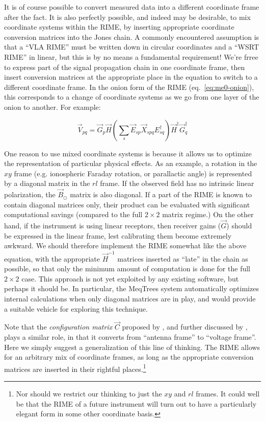 \documentclass[]{aa}
\begin{document}
It is of course possible to convert measured data into a different coordinate frame after the fact. It is also perfectly possible, and indeed may be desirable, to mix coordinate systems within the RIME, by inserting appropriate coordinate conversion matrices into the Jones chain. A commonly encountered assumption is that a ``VLA RIME'' must be written down in circular coordinates and a ``WSRT RIME'' in linear, but this is by no means a fundamental requirement! We're frree to express part of the signal propagation chain in one coordinate frame, then insert conversion matrices at the appropriate place in the equation to switch to a different coordinate frame. In the onion form of the RIME (eq.~\ref{eq:me0-onion}), this corresponds to a change of coordinate systems as we go from one layer of the onion to another. For example:

\[
\vec V_{pq} = \vec G_p \vec H \left ( \sum_{s}{\vec E_{sp} \vec X_{spq} E^\dagger_{sq}} \right ) \vec H^\dagger \vec G^\dagger_q
\] 

One reason to use mixed coordinate systems is because it allows us to optimize the representation of particular physical effects. As an example, a rotation in the $xy$ frame (e.g. ionospheric Faraday rotation, or parallactic angle) is represented by a diagonal matrix in the $rl$ frame. If the observed field has no intrinsic linear polarization, the $\vec B_\odot$ matrix is also diagonal. If a part of the RIME is known to contain diagonal matrices only, their product can be evaluated with significant computational savings (compared to the full $2\times2$ matrix regime.) On the other hand, if the instrument is using linear receptors, then receiver gains ($\vec G$) should be expressed in the linear frame, lest calibrating them become extremely awkward. We should therefore implement the RIME somewhat like the above equation, with the appropriate $\vec H^{-1}$ matrices inserted as ``late'' in the chain as possible, so that only the minimum amount of computation is done for the full $2\times2$ case. This approach is not yet exploited by any existing software, but perhaps it should be. In particular, the MeqTrees system \citep{meqtrees} automatically optimizes internal calculations when only diagonal matrices are in play, and would provide a suitable vehicle for exploring this technique.

Note that the {\em configuration matrix} $\vec C$ proposed by \citet{ME1}, and further discussed by \citet{JEN:note185}, plays a similar role, in that it converts from ``antenna frame'' to ``voltage frame''. Here we simply suggest a generalization of this line of thinking. The RIME allows for an arbitrary mix of coordinate frames, as long as the appropriate conversion matrices are inserted in their rightful places.\footnote{Nor should we restrict our thinking to just the $xy$ and $rl$ frames. It could well be that the RIME of a future instrument will turn out to have a particularly elegant form in some other coordinate basis.}
\end{document}
